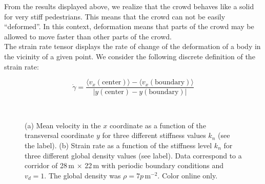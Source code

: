 \documentclass[preprint,12pt]{elsarticle}
\begin{document}
From the results displayed above, we realize that the crowd behaves like a solid for very stiff pedestrians. This means that the crowd can not be easily ``deformed''. In this context, deformation means that parts of the crowd may be allowed to move faster than other parts of the crowd. \\

The strain rate tensor displays the rate of change of the deformation of a body in the vicinity of a given point.
 We consider the following discrete definition of the strain rate:

\begin{equation}
\dot{\gamma} = \frac{\langle v_x(\mathrm{center})\rangle - \langle v_x(\mathrm{boundary})\rangle }{\left | y(\mathrm{center}) - y(\mathrm{boundary}) \right |} 
\end{equation}


\begin{figure}[!htbp]
\centering
    \ 
    \\
\caption[width=0.47\columnwidth]{(a) Mean velocity in the $x$ coordinate as a function of the transversal coordinate $y$ for three different stiffness values $k_n$ (see the label). (b) Strain rate as a function of the stiffness level $k_n$ for three different global density values (see label). Data correspond to a corridor of 28$\,$m $\times$ 22$\,$m with periodic boundary conditions and $v_d=1$. The global density was $\rho=7 p\,$m$^{-2}$. Color online only. }
\label{profile_strain}
\end{figure}
\end{document}
